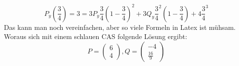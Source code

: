 \begin{displaymath}
P_y\left(\frac{3}{4}\right) = 3 = 3 P_y \frac{3}{4}\left(1-\frac{3}{4}\right)^2+3Q_y\frac{3}{4}^2\left(1-\frac{3}{4}\right)+4\frac{3}{4}^3
\end{displaymath}
Das kann man noch vereinfachen, aber so viele Formeln in Latex ist mühsam. Woraus sich mit einem schlauen CAS folgende Lösung ergibt:
\begin{displaymath}
P = \begin{pmatrix}6 \\ 4\end{pmatrix}, Q = \begin{pmatrix}-4 \\ \frac{16}{9}\end{pmatrix}
\end{displaymath}
